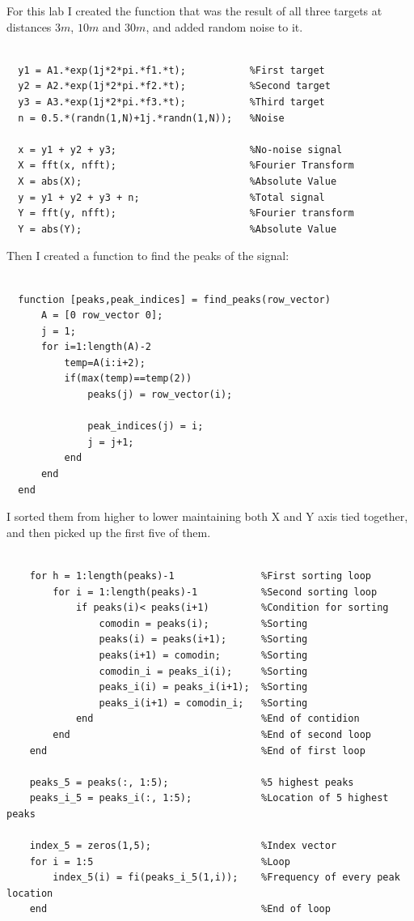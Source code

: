 \documentclass[a4paper,11pt]{article}
\begin{document}
For this lab I created the function that was the result of all three targets at
distances $3m$, $10m$ and $30m$, and added random noise to it.

\bigskip
\begin{lstlisting}

  y1 = A1.*exp(1j*2*pi.*f1.*t);           %First target
  y2 = A2.*exp(1j*2*pi.*f2.*t);           %Second target
  y3 = A3.*exp(1j*2*pi.*f3.*t);           %Third target
  n = 0.5.*(randn(1,N)+1j.*randn(1,N));   %Noise

  x = y1 + y2 + y3;                       %No-noise signal
  X = fft(x, nfft);                       %Fourier Transform
  X = abs(X);                             %Absolute Value
  y = y1 + y2 + y3 + n;                   %Total signal
  Y = fft(y, nfft);                       %Fourier transform
  Y = abs(Y);                             %Absolute Value

\end{lstlisting}
\bigskip

Then I created a function to find the peaks of the signal:

\bigskip
\begin{lstlisting}

  function [peaks,peak_indices] = find_peaks(row_vector)
      A = [0 row_vector 0];
      j = 1;
      for i=1:length(A)-2
          temp=A(i:i+2);
          if(max(temp)==temp(2))
              peaks(j) = row_vector(i);

              peak_indices(j) = i;
              j = j+1;
          end
      end
  end

\end{lstlisting}
\bigskip

I sorted them from higher to lower maintaining both X and Y axis tied together,
and then picked up the first five of them.

\newpage

\bigskip
\begin{lstlisting}

    for h = 1:length(peaks)-1               %First sorting loop
        for i = 1:length(peaks)-1           %Second sorting loop
            if peaks(i)< peaks(i+1)         %Condition for sorting
                comodin = peaks(i);         %Sorting
                peaks(i) = peaks(i+1);      %Sorting
                peaks(i+1) = comodin;       %Sorting
                comodin_i = peaks_i(i);     %Sorting
                peaks_i(i) = peaks_i(i+1);  %Sorting
                peaks_i(i+1) = comodin_i;   %Sorting
            end                             %End of contidion
        end                                 %End of second loop
    end                                     %End of first loop

    peaks_5 = peaks(:, 1:5);                %5 highest peaks
    peaks_i_5 = peaks_i(:, 1:5);            %Location of 5 highest peaks

    index_5 = zeros(1,5);                   %Index vector
    for i = 1:5                             %Loop
        index_5(i) = fi(peaks_i_5(1,i));    %Frequency of every peak location
    end                                     %End of loop

\end{lstlisting}
\bigskip
\end{document}
